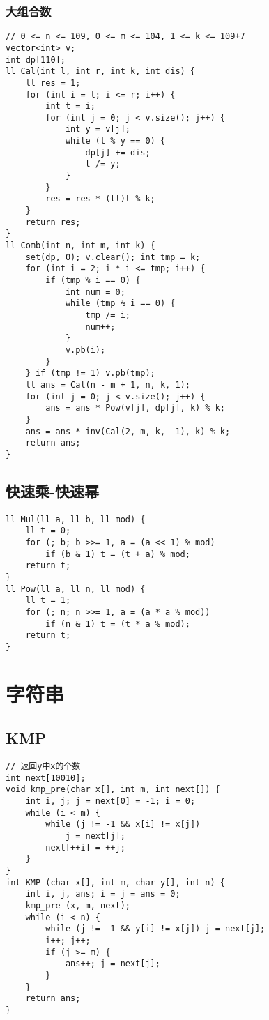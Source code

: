 \documentclass[a4paper]{article}
\begin{document}
\subsubsection{大组合数}
\begin{lstlisting}
// 0 <= n <= 109, 0 <= m <= 104, 1 <= k <= 109+7
vector<int> v;
int dp[110];
ll Cal(int l, int r, int k, int dis) {
	ll res = 1;
	for (int i = l; i <= r; i++) {
		int t = i;
		for (int j = 0; j < v.size(); j++) {
			int y = v[j];
			while (t % y == 0) {
				dp[j] += dis;
				t /= y;
			}
		}
		res = res * (ll)t % k;
	}
	return res;
}
ll Comb(int n, int m, int k) {
	set(dp, 0); v.clear(); int tmp = k;
	for (int i = 2; i * i <= tmp; i++) {
		if (tmp % i == 0) {
			int num = 0;
			while (tmp % i == 0) {
				tmp /= i;
				num++;
			}
			v.pb(i);
		}
	} if (tmp != 1) v.pb(tmp);
	ll ans = Cal(n - m + 1, n, k, 1);
	for (int j = 0; j < v.size(); j++) {
		ans = ans * Pow(v[j], dp[j], k) % k;
	}
	ans = ans * inv(Cal(2, m, k, -1), k) % k;
	return ans;
}
\end{lstlisting}
\subsection{快速乘-快速幂}
\begin{lstlisting}
ll Mul(ll a, ll b, ll mod) {
	ll t = 0;
	for (; b; b >>= 1, a = (a << 1) % mod)
		if (b & 1) t = (t + a) % mod;
	return t;
} 
ll Pow(ll a, ll n, ll mod) {
	ll t = 1;
	for (; n; n >>= 1, a = (a * a % mod))
		if (n & 1) t = (t * a % mod);
	return t;
}
\end{lstlisting}
\clearpage
\section{字符串}
\subsection{KMP}
\begin{lstlisting}
// 返回y中x的个数
int next[10010];
void kmp_pre(char x[], int m, int next[]) {
    int i, j; j = next[0] = -1; i = 0;
    while (i < m) {
        while (j != -1 && x[i] != x[j])
            j = next[j];
        next[++i] = ++j;
    }
}
int KMP (char x[], int m, char y[], int n) {
    int i, j, ans; i = j = ans = 0;
    kmp_pre (x, m, next);
    while (i < n) {
        while (j != -1 && y[i] != x[j]) j = next[j];
        i++; j++;
        if (j >= m) {
            ans++; j = next[j];
        }
    }
    return ans;
}
\end{lstlisting}
\end{document}
